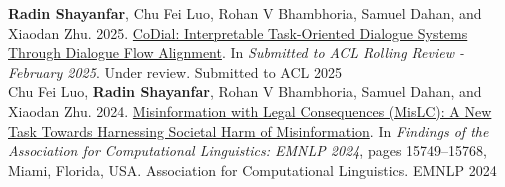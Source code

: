 
\begin{cvhonors}

  \cvpub
    {\textbf{Radin Shayanfar}, Chu Fei Luo, Rohan V Bhambhoria, Samuel Dahan, and Xiaodan Zhu. 2025. \href{https://openreview.net/forum?id=16YvlLzGeg}{CoDial: Interpretable Task-Oriented Dialogue Systems Through Dialogue Flow Alignment}. In \textit{Submitted to ACL Rolling Review - February 2025}. Under review.} %
    {Submitted to ACL} %
    {2025} %
\\
  \cvpub
    {Chu Fei Luo, \textbf{Radin Shayanfar}, Rohan V Bhambhoria, Samuel Dahan, and Xiaodan Zhu. 2024. \href{https://aclanthology.org/2024.findings-emnlp.924/}{Misinformation with Legal Consequences (MisLC): A New Task Towards Harnessing Societal Harm of Misinformation}. In \textit{Findings of the Association for Computational Linguistics: EMNLP 2024}, pages 15749–15768, Miami, Florida, USA. Association for Computational Linguistics.} %
    {EMNLP} %
    {2024} %
\end{cvhonors}






